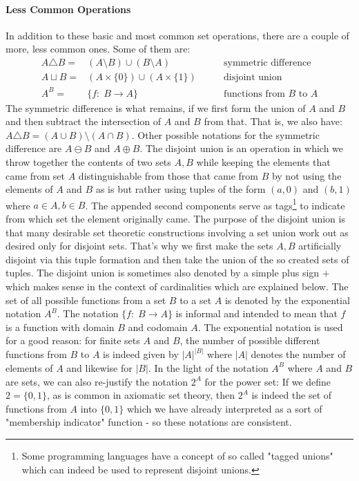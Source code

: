 \paragraph{Less Common Operations}
In addition to these basic and most common set operations, there are a couple of more, less common ones. Some of them are:
\begin{eqnarray}
 A \triangle B =& (A \setminus B) \cup (B \setminus A)      \qquad &\text{symmetric difference} \\
 A \sqcup B    =& (A \times \{0\})  \cup  (A \times \{1\})  \qquad &\text{disjoint union} \\
 A ^ B         =& \{ f: \; B \rightarrow A  \}              \qquad &\text{functions from $B$ to $A$} 
\end{eqnarray}
The symmetric difference is what remains, if we first form the union of $A$ and $B$ and then subtract the intersection of $A$ and $B$ from that. That is, we also have: $A \triangle B = (A \cup B) \setminus (A \cap B)$. Other possible notations for the symmetric difference are $A \ominus B$ and $A \oplus B$. The disjoint union is an operation in which we throw together the contents of two sets $A,B$ while keeping the elements that came from set $A$ distinguishable from those that came from $B$ by not using the elements of $A$ and $B$ as is but rather using tuples of the form $(a,0)$ and $(b,1)$ where $a \in A, b \in B$. The appended second components serve as tags\footnote{Some programming languages have a concept of so called "tagged unions" which can indeed be used to represent disjoint unions.} to indicate from which set the element originally came. The purpose of the disjoint union is that many desirable set theoretic constructions involving a set union work out as desired only for disjoint sets. That's why we first make the sets $A,B$ artificially disjoint via this tuple formation and then take the union of the so created sets of tuples. The disjoint union is sometimes also denoted by a simple plus sign $+$ which makes sense in the context of cardinalities which are explained below. The set of all possible functions from a set $B$ to a set $A$ is denoted by the exponential notation $A^B$. The notation $\{ f: \; B \rightarrow A \}$ is informal and intended to mean that $f$ is a function with domain $B$ and codomain $A$. The exponential notation is used for a good reason: for finite sets $A$ and $B$, the number of possible different functions from $B$ to $A$ is indeed given by $|A|^{|B|}$ where $|A|$ denotes the number of elements of $A$ and likewise for $|B|$. In the light of the notation $A^B$ where $A$ and $B$ are sets, we can also re-justify the notation $2^A$ for the power set: If we define $2 = \{0, 1\}$, as is common in axiomatic set theory, then $2^A$ is indeed the set of functions from $A$ into $\{0, 1\}$ which we have already interpreted as a sort of "membership indicator" function - so these notations are consistent.

